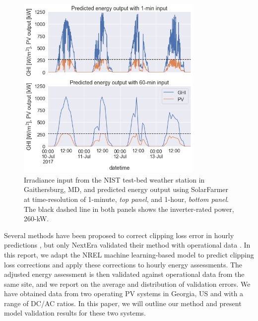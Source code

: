 \documentclass[conference]{IEEEtran}
\begin{document}
\begin{figure}[htbp]
\centerline{\includegraphics[width=9cm]{hourly_v_1-min_clipping.png}}
\caption{Irradiance input from the NIST test-bed weather station in Gaithersburg, MD, and predicted energy output using SolarFarmer at time-resolution of 1-minute, \textit{top panel}, and 1-hour, \textit{bottom panel}. The black dashed line in both panels shows the inverter-rated power, 260-kW.}
\label{fig:irradiance-and-power}
\end{figure}


Several methods have been proposed to correct clipping loss error in hourly predictions \cite{Cormode2019,Kharait,Anderson2020,Bradford}, but only NextEra validated their method with operational data \cite{Bradford}. 
In this report, we adapt the NREL machine learning-based model \cite{Anderson2020} to predict clipping loss corrections and apply these corrections to hourly energy assessments. The adjusted energy assessment is then validated against operational data from the same site, and we report on the average and distribution of validation errors.  We have obtained data from two operating PV systems in Georgia, US and with a range of DC/AC ratios. In this paper, we will outline our method and present model validation results for these two systems. 
\end{document}

